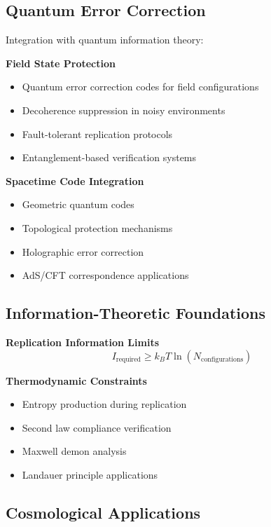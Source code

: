 \documentclass[11pt]{article}
\begin{document}
\subsection{Quantum Error Correction}

Integration with quantum information theory:

\textbf{Field State Protection}
\begin{itemize}
\item Quantum error correction codes for field configurations
\item Decoherence suppression in noisy environments
\item Fault-tolerant replication protocols
\item Entanglement-based verification systems
\end{itemize}

\textbf{Spacetime Code Integration}
\begin{itemize}
\item Geometric quantum codes
\item Topological protection mechanisms
\item Holographic error correction
\item AdS/CFT correspondence applications
\end{itemize}

\subsection{Information-Theoretic Foundations}

\textbf{Replication Information Limits}
\begin{equation}
I_{\text{required}} \geq k_B T \ln(N_{\text{configurations}})
\end{equation}

\textbf{Thermodynamic Constraints}
\begin{itemize}
\item Entropy production during replication
\item Second law compliance verification
\item Maxwell demon analysis
\item Landauer principle applications
\end{itemize}

\subsection{Cosmological Applications}
\end{document}
